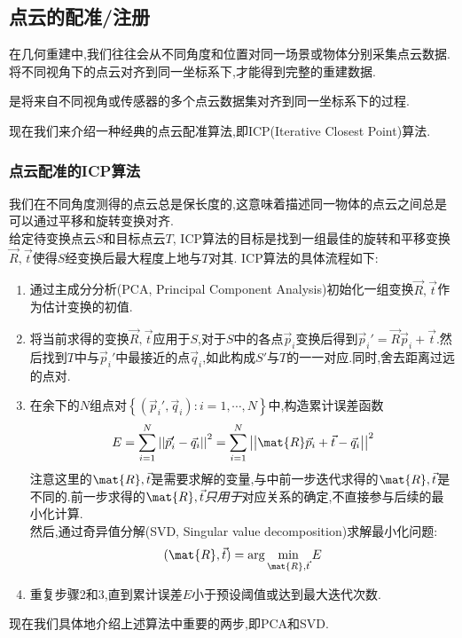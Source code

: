 \documentclass{ctexart}
\begin{document}
\subsection{点云的配准/注册}
在几何重建中,我们往往会从不同角度和位置对同一场景或物体分别采集点云数据.将不同视角下的点云对齐到同一坐标系下,才能得到完整的重建数据.
\begin{definition}[点云配准/注册]
    是将来自不同视角或传感器的多个点云数据集对齐到同一坐标系下的过程.
\end{definition}
现在我们来介绍一种经典的点云配准算法,即ICP(Iterative Closest Point)算法.
\subsubsection{点云配准的ICP算法}
我们在不同角度测得的点云总是保长度的,这意味着描述同一物体的点云之间总是可以通过平移和旋转变换对齐.\\
\indent 给定待变换点云$S$和目标点云$T$, ICP算法的目标是找到一组最佳的旋转和平移变换$\vec{R},\vec{t}$使得$S$经变换后最大程度上地与$T$对其. ICP算法的具体流程如下:
\begin{enumerate}[label=\tbf{\arabic*.},topsep=0pt,parsep=0pt,itemsep=0pt,partopsep=0pt]
    \item 通过主成分分析(PCA, Principal Component Analysis)初始化一组变换$\vec{R},\vec{t}$作为估计变换的初值.
    \item 将当前求得的变换$\vec{R},\vec{t}$应用于$S$,对于$S$中的各点$\vec{p}_i$变换后得到$\vec{p}_i'=\vec{R}\vec{p}_i+\vec{t}$.然后找到$T$中与$\vec{p}_i'$中最接近的点$\vec{q}_i$,如此构成$S'$与$T$的一一对应.同时,舍去距离过远的点对.
    \item 在余下的$N$组点对$\left\{\left(\vec{p}_i',\vec{q}_i\right):i=1,\cdots,N\right\}$中,构造累计误差函数
    \[E=\sum_{i=1}^{N}\left|\left|\vec{p}_i'-\vec{q}_i\right|\right|^2=\sum_{i=1}^{N}\left|\left|\mat{R}\vec{p}_i+\vec{t}-\vec{q}_i\right|\right|^2\]
    注意这里的$\mat{R},\vec{t}$是需要求解的变量,与中前一步迭代求得的$\mat{R},\vec{t}$是不同的.前一步求得的$\mat{R},\vec{t}$\textit{只用于}对应关系的确定,不直接参与后续的最小化计算.\\
    然后,通过奇异值分解(SVD, Singular value decomposition)求解最小化问题:
    \[(\mat{R},\vec{t})=\arg\min_{\mat{R},\vec{t}}E\]
    \item 重复步骤2和3,直到累计误差$E$小于预设阈值或达到最大迭代次数.
\end{enumerate}
现在我们具体地介绍上述算法中重要的两步,即PCA和SVD.
\end{document}
